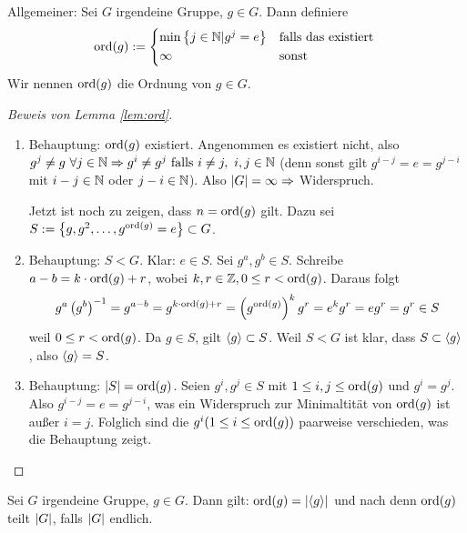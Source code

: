 \documentclass[12pt,a4paper]{scrartcl}
\begin{document}
\begin{defi}
	Allgemeiner: Sei $G$ irgendeine Gruppe, $g \in G$. Dann definiere \begin{equation*}
		\ord(g) := \begin{cases*}
		\min \left\lbrace j \in \IN | g^j = e\right\rbrace &falls das existiert \\
		\infty &sonst
		\end{cases*}
	\end{equation*}
	Wir nennen $\operatorname{ord}(g)$ die Ordnung von $g \in G$.
\end{defi}

\begin{proof} [Beweis von Lemma \ref{lem:ord}]
	\begin{enumerate}
	\item Behauptung: $\operatorname{ord}(g)$ existiert. Angenommen es existiert nicht, also 
	$
		g^j \not = g ~ \forall j \in \mathbb N \Rightarrow g^i \neq g^j \text{ falls } i \neq j, ~ i,j \in \mathbb N 
	$
	(denn sonst gilt $g^{i-j}=e=g^{j-i}$ mit $i-j \in \mathbb N$ oder $j-i \in \mathbb N$).
	Also $\lvert G\rvert = \infty \Rightarrow$ Widerspruch.
	
	Jetzt ist noch zu zeigen, dass $n = \operatorname{ord}(g)$ gilt. Dazu sei $S := \left\lbrace g, g^2, \ldots, g^{\operatorname{ord}(g)} = e \right\rbrace \subset G$.
	
	\item Behauptung: $S < G$. Klar: $e \in S$. Sei $g^a, g^b \in S$. Schreibe $a-b = k \cdot \operatorname{ord}(g) + r$, wobei $k, r \in \mathbb Z, 0 \leq r < \operatorname{ord}(g)$. Daraus folgt
	\begin{equation*}
		g^a\left( g^b \right)^{-1}=g^{a-b}=g^{k \cdot \operatorname{ord}(g)+r}
		= \left(g^{\operatorname{ord}(g)} \right)^kg^r = e^kg^r=eg^r=g^r \in S
	\end{equation*}
	weil $0 \leq r < \operatorname{ord}(g)$.
	Da $g \in S$, gilt $\langle g\rangle\subset S$. Weil $S < G$ ist klar, dass $S \subset \langle g\rangle$, also $\langle g\rangle = S$.
	\item Behauptung: $\lvert S\rvert = \operatorname{ord}(g)$. Seien $g^i, g^j \in S$ mit $1 \leq i,j \leq \operatorname{ord}(g)$ und $g^i=g^j$. Also $g^{i-j} = e = g^{j-i}$, was ein Widerspruch zur Minimaltität von $\operatorname{ord}(g)$ ist außer $i=j$. Folglich sind die $g^i (1\leq i \leq \operatorname{ord}(g))$ paarweise verschieden, was die Behauptung zeigt.
	\qedhere
	\end{enumerate}
\end{proof}

\begin{bem}
	Sei $G$ irgendeine Gruppe, $g\in G$. Dann gilt: $\operatorname{ord}(g) = \lvert\langle g\rangle\rvert$ und nach  denn $\operatorname{ord}(g)$ teilt $\lvert G\rvert$, falls $\lvert G\rvert$ endlich.
\end{bem}
\end{document}
